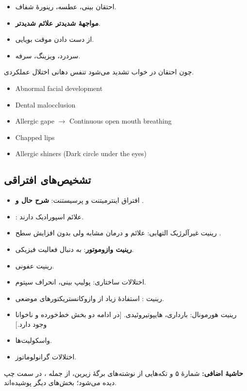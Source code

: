\documentclass[12pt,a4paper]{article}
\begin{document}
\begin{itemize}
\item احتقان بینی، عطسه، رینورهٔ شفاف.
\item \textbf{مواجههٔ شدیدتر \lr{\(\longrightarrow\)} علائم شدیدتر}.
\item از دست دادن موقت بویایی.
\item سردرد، ویزینگ، سرفه.
\end{itemize}
چون احتقان در خواب تشدید می‌شود \lr{\(\longrightarrow\)} تنفس دهانی \lr{\(\longrightarrow\)} اختلال عملکردی.
\begin{latin}
\begin{itemize}
\item Abnormal facial development
\item Dental malocclusion
\item Allergic gape \(\longrightarrow\) Continuous open mouth breathing
\item Chapped lips
\item Allergic shiners (Dark circle under the eyes)
\end{itemize}
\end{latin}
\subsection*{تشخیص‌های افتراقی}
\begin{itemize}
\item افتراق  اینترمیتنت و پرسیستنت: \textbf{شرح حال و }.
\item {}: علائم اسپورادیک دارند.
\item رینیت غیرآلرژیک التهابی: علائم و درمان مشابه  ولی بدون افزایش سطح .
\item \textbf{رینیت وازوموتور}: به دنبال فعالیت فیزیکی.
\item رینیت عفونی.
\item اختلالات ساختاری: پولیپ بینی، انحراف سپتوم.
\item رینیت : استفادهٔ زیاد از وازوکانستریکتورهای موضعی.
\item رینیت هورمونال: بارداری، هایپوتیروئیدی. [در ادامه دو بخش خط‌خورده و ناخوانا وجود دارد.]
\item واسکولیت‌ها.
\item اختلالات گرانولوماتوز.
\end{itemize}

\textbf{حاشیهٔ اضافی:} شمارهٔ ۵ و تکه‌هایی از نوشته‌های برگهٔ زیرین، از جمله ، در سمت چپ دیده می‌شود؛ بخش‌های دیگر پوشیده‌اند.
\end{document}
